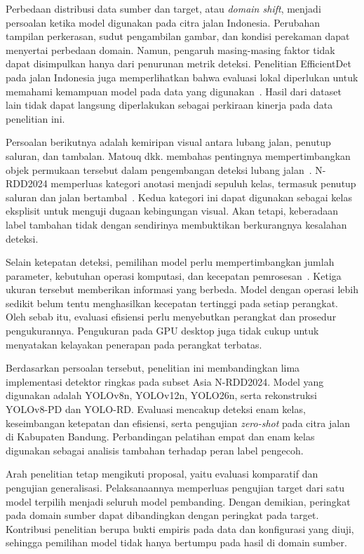 Perbedaan distribusi data sumber dan target, atau \textit{domain shift}, menjadi persoalan ketika model digunakan pada citra jalan Indonesia. Perubahan tampilan perkerasan, sudut pengambilan gambar, dan kondisi perekaman dapat menyertai perbedaan domain. Namun, pengaruh masing-masing faktor tidak dapat disimpulkan hanya dari penurunan metrik deteksi. Penelitian EfficientDet pada jalan Indonesia juga memperlihatkan bahwa evaluasi lokal diperlukan untuk memahami kemampuan model pada data yang digunakan~\cite{hugo2025efficientdet}. Hasil dari dataset lain tidak dapat langsung diperlakukan sebagai perkiraan kinerja pada data penelitian ini.

Persoalan berikutnya adalah kemiripan visual antara lubang jalan, penutup saluran, dan tambalan. Matouq dkk. membahas pentingnya mempertimbangkan objek permukaan tersebut dalam pengembangan deteksi lubang jalan~\cite{matouq2024ai}. N-RDD2024 memperluas kategori anotasi menjadi sepuluh kelas, termasuk penutup saluran dan jalan bertambal~\cite{kaya2024nrdd2024}. Kedua kategori ini dapat digunakan sebagai kelas eksplisit untuk menguji dugaan kebingungan visual. Akan tetapi, keberadaan label tambahan tidak dengan sendirinya membuktikan berkurangnya kesalahan deteksi.

Selain ketepatan deteksi, pemilihan model perlu mempertimbangkan jumlah parameter, kebutuhan operasi komputasi, dan kecepatan pemrosesan~\cite{Wu2023}. Ketiga ukuran tersebut memberikan informasi yang berbeda. Model dengan operasi lebih sedikit belum tentu menghasilkan kecepatan tertinggi pada setiap perangkat. Oleh sebab itu, evaluasi efisiensi perlu menyebutkan perangkat dan prosedur pengukurannya. Pengukuran pada GPU desktop juga tidak cukup untuk menyatakan kelayakan penerapan pada perangkat terbatas.

Berdasarkan persoalan tersebut, penelitian ini membandingkan lima implementasi detektor ringkas pada subset Asia N-RDD2024. Model yang digunakan adalah YOLOv8n, YOLOv12n, YOLO26n, serta rekonstruksi YOLOv8-PD dan YOLO-RD. Evaluasi mencakup deteksi enam kelas, keseimbangan ketepatan dan efisiensi, serta pengujian \textit{zero-shot} pada citra jalan di Kabupaten Bandung. Perbandingan pelatihan empat dan enam kelas digunakan sebagai analisis tambahan terhadap peran label pengecoh.

Arah penelitian tetap mengikuti proposal, yaitu evaluasi komparatif dan pengujian generalisasi. Pelaksanaannya memperluas pengujian target dari satu model terpilih menjadi seluruh model pembanding. Dengan demikian, peringkat pada domain sumber dapat dibandingkan dengan peringkat pada target. Kontribusi penelitian berupa bukti empiris pada data dan konfigurasi yang diuji, sehingga pemilihan model tidak hanya bertumpu pada hasil di domain sumber.

